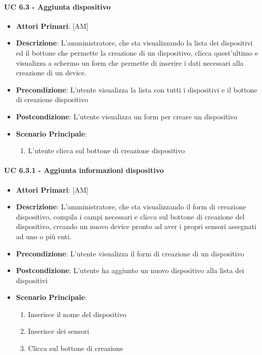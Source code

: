 			\paragraph{UC 6.3 - Aggiunta dispositivo}
			\begin{itemize}
				\item \textbf{Attori Primari}: [AM]
				\item \textbf{Descrizione}: L'amministratore, che sta visualizzando la lista dei dispositivi ed il bottone che permette la creazione di un dispositivo, clicca quest'ultimo e visualizza a schermo un form che permette di inserire i dati necessari alla creazione di un device.
				\item \textbf{Precondizione}: L'utente visualizza la lista con tutti i dispositivi e il bottone di creazione dispositivo 
				\item \textbf{Postcondizione}: L'utente visualizza un form per creare un dispositivo
				\item \textbf{Scenario Principale}:
				\begin{enumerate}
					\item{L'utente clicca sul bottone di creazione dispositivo}
				\end{enumerate}	
			\end{itemize}

			\paragraph{UC 6.3.1 - Aggiunta informazioni dispositivo}
			\begin{itemize}
				\item \textbf{Attori Primari}: [AM]
				\item \textbf{Descrizione}: L'amministratore, che sta visualizzando il form di creazione dispositivo, compila i campi necessari e clicca sul bottone di creazione del dispositivo, creando un nuovo device pronto ad aver i propri sensori assegnati ad uno o più enti.
				\item \textbf{Precondizione}: L'utente visualizza il form di creazione di un dispositivo
				\item \textbf{Postcondizione}: L'utente ha aggiunto un nuovo dispositivo alla lista dei dispositivi
				\item \textbf{Scenario Principale}:
				\begin{enumerate}
					\item{Inserisce il nome del dispositivo}
					\item{Inserisce dei sensori}
					\item{Clicca sul bottone di creazione}
				\end{enumerate}	
			\end{itemize}


